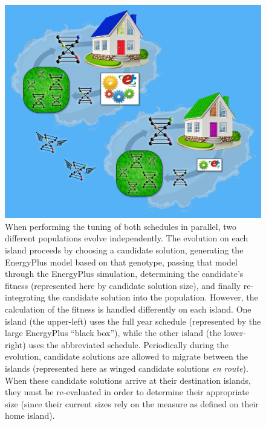 \documentclass[preprint, review, 12pt]{elsarticle}
\begin{document}
\begin{figure}[htbp]
\centering
\includegraphics[width=5in]{graphics/autotune_islands}
\caption{When performing the tuning of both schedules in parallel, two different populations evolve independently. The evolution on each island proceeds by choosing a candidate solution, generating the EnergyPlus model based on that genotype, passing that model through the EnergyPlus simulation, determining the candidate's fitness (represented here by candidate solution size), and finally re-integrating the candidate solution into the population. However, the calculation of the fitness is handled differently on each island. One island (the upper-left) uses the full year schedule (represented by the large EnergyPlus ``black box''), while the other island (the lower-right) uses the abbreviated schedule. Periodically during the evolution, candidate solutions are allowed to migrate between the islands (represented here as winged candidate solutions \emph{en route}). When these candidate solutions arrive at their destination islands, they must be re-evaluated in order to determine their appropriate size (since their current sizes rely on the measure as defined on their home island).}
\label{fig:islands}
\end{figure}
\end{document}
